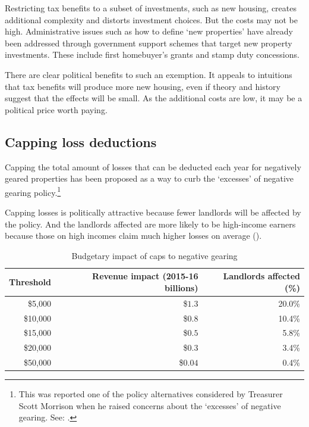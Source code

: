 Restricting tax benefits to a subset of investments, such as new housing, creates additional complexity and distorts investment choices. But the costs may not be high. Administrative issues such as how to define ‘new properties’ have already been addressed through government support schemes that target new property investments. These include first homebuyer’s grants and stamp duty concessions. 

There are clear political benefits to such an exemption.  It appeals to intuitions that tax benefits will produce more new housing, even if theory and history suggest that the effects will be small.  As the additional costs are low, it may be a political price worth paying.



\subsection{Capping loss deductions}
Capping the total amount of losses that can be deducted each year for negatively geared properties has been proposed as a way to curb the ‘excesses’ of negative gearing policy.\footnote{This was reported one of the policy alternatives considered by Treasurer Scott Morrison when he raised concerns about the ‘excesses’ of negative gearing. See: \textcite{Coorey2016}.}



Capping losses is politically attractive because fewer landlords will be affected by the policy. 
And the landlords affected are more likely to be high-income earners because those on high incomes claim much higher losses on average (). 

\begin{table}
\caption{Budgetary impact of caps to negative gearing}\label{tbl:cap-NG}
\centering
\begin{tabularx}{0.80\linewidth}{rRR}
  \toprule
{\textbf{Threshold}} & {\textbf{Revenue impact (2015-16 billions)}} & {\textbf{Landlords affected (\%)}} \\ 
  \midrule
  \$5,000 & \$$1.3$\phantom{0} &  20.0\% \\ 
  \$10,000 & \$$0.8$\phantom{0} &  10.4\% \\ 
  \$15,000 & \$$0.5$\phantom{0} &  5.8\% \\ 
  \$20,000 & \$$0.3$\phantom{0} & 3.4\% \\ 
  \$50,000 & \$$0.04$ & 0.4\% \\ 
   \bottomrule
\end{tabularx}

\end{table}

